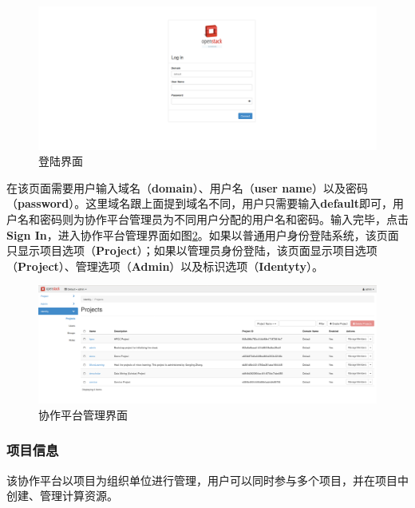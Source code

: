 \documentclass[12pt]{article}
\begin{document}
\begin{figure}[!htb]
\centering
\includegraphics[width=6in]{./figures/login}
\caption{登陆界面}
\label{fig:login}
\end{figure}
在该页面需要用户输入域名（\textbf{domain}）、用户名（\textbf{user name}）以及密码（\textbf{password}）。这里域名跟上面提到域名不同，用户只需要输入\textbf{default}即可，用户名和密码则为协作平台管理员为不同用户分配的用户名和密码。输入完毕，点击\textbf{Sign In}，进入协作平台管理界面如图\ref{fig:afterLogin}。如果以普通用户身份登陆系统，该页面只显示项目选项（\textbf{Project}）；如果以管理员身份登陆，该页面显示项目选项（\textbf{Project}）、管理选项（\textbf{Admin}）以及标识选项（\textbf{Identyty}）。
\begin{figure}[!htb]
\centering
\includegraphics[width=6in]{./figures/afterLogin}
\caption{协作平台管理界面}
\label{fig:afterLogin}
\end{figure}
\subsubsection{项目信息}
该协作平台以项目为组织单位进行管理，用户可以同时参与多个项目，并在项目中创建、管理计算资源。
\end{document}
